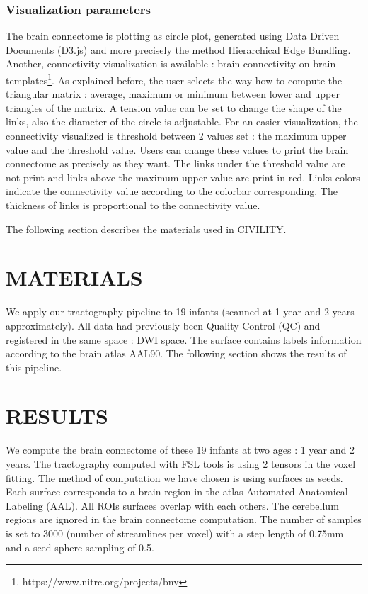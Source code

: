 \documentclass[]{spie}  %
\begin{document}
\subsubsection{Visualization parameters}

The brain connectome is plotting as circle plot, generated using Data Driven Documents (D3.js) and more precisely the method Hierarchical Edge Bundling. Another, connectivity visualization is available : brain connectivity on brain templates\footnote{https://www.nitrc.org/projects/bnv}.
As explained before, the user selects the way how to compute the triangular matrix : average, maximum or minimum between lower and upper triangles of the matrix. 
A tension value can be set to change the shape of the links, also the diameter of the circle is adjustable.
For an easier visualization, the connectivity visualized is threshold between 2 values set : the maximum upper value and the threshold value. Users can change these values to print the brain connectome as precisely as they want. The links under the threshold value are not print and links above the maximum upper value are print in red. 
Links colors  indicate the connectivity value according to the colorbar corresponding. The thickness of links is proportional to the connectivity value.

The following section describes the materials used in CIVILITY.

\section{MATERIALS}

We apply our tractography pipeline to 19 infants (scanned at 1 year and 2 years approximately).
All data had previously been Quality Control (QC) and registered in the same space : DWI space. The surface contains labels information according to the brain atlas AAL90. 
The following section shows the results of this pipeline. 

\section{RESULTS} 

We compute the brain connectome of these 19 infants at two ages : 1 year and 2 years. The tractography computed with FSL tools is using 2 tensors in the voxel fitting. The method of computation we have chosen is using surfaces as seeds. Each surface corresponds to a brain region in the atlas Automated Anatomical Labeling (AAL). All ROIs surfaces overlap with each others. The cerebellum regions are ignored in the brain connectome computation. The number of samples is set to 3000 (number of streamlines per voxel) with a step length of 0.75mm and a seed sphere sampling of 0.5. 
\end{document}
